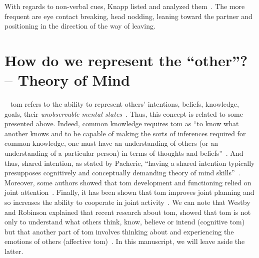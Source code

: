 \documentclass[a4paper,11pt,twoside]{StyleThese}
\begin{document}
With regards to non-verbal cues, Knapp \etal{} listed and analyzed them~\cite{knapp_1973_rhetoric}. The more frequent are eye contact breaking, head nodding, leaning toward the partner and positioning in the direction of the way of leaving.

\section{How do we represent the ``other''? -- Theory of Mind}~\label{chap1:subsec:tom}
\acrfull{tom} refers to the ability to represent others' intentions, beliefs, knowledge, goals, \ie their \emph{unobservable mental states}~\cite{premack_1978_does,povinelli_2004_we}. Thus, this concept is related to some presented above. Indeed, common knowledge requires \acrshort{tom} as ``to know what another knows and to be capable of making the sorts of inferences required for common knowledge, one must have an understanding of others (or an understanding of a particular person) in terms of thoughts and beliefs''~\cite[p.~82]{tollefsen_2005_let}. And thus, shared intention, as stated by Pacherie, ``having a shared intention typically presupposes cognitively and conceptually demanding theory of mind skills''~\cite[p.~1817]{pacherie_2013_intentional}. Moreover, some authors showed that \acrshort{tom} development and functioning relied on joint attention~\cite{sodian_2015_declarative, camaioni_2004_role}.  Finally, it has been shown that \acrshort{tom} improves joint planning and so increases the ability to cooperate in joint activity~\cite{astington_1995_theory}. We can note that Westby and Robinson explained that recent research about \acrshort{tom}, showed that \acrshort{tom} is not only to understand what others think, know, believe or intend (cognitive \acrshort{tom}) but that another part of \acrshort{tom} involves thinking about and experiencing the emotions of others (affective \acrshort{tom})~\cite{westby_2014_developmental}. In this manuscript, we will leave aside the latter.
\end{document}
